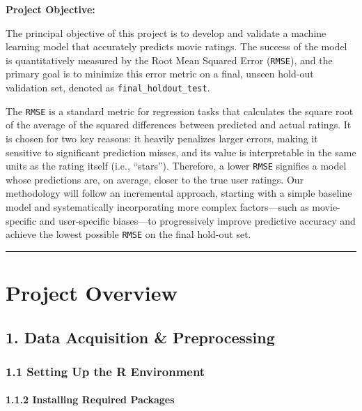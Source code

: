 \documentclass[
]{article}
\begin{document}
\textbf{Project Objective:}

The principal objective of this project is to develop and validate a
machine learning model that accurately predicts movie ratings. The
success of the model is quantitatively measured by the Root Mean Squared
Error (\texttt{RMSE}), and the primary goal is to minimize this error
metric on a final, unseen hold-out validation set, denoted as
\texttt{final\_holdout\_test}.

The \texttt{RMSE} is a standard metric for regression tasks that
calculates the square root of the average of the squared differences
between predicted and actual ratings. It is chosen for two key reasons:
it heavily penalizes larger errors, making it sensitive to significant
prediction misses, and its value is interpretable in the same units as
the rating itself (i.e., ``stars''). Therefore, a lower \texttt{RMSE}
signifies a model whose predictions are, on average, closer to the true
user ratings. Our methodology will follow an incremental approach,
starting with a simple baseline model and systematically incorporating
more complex factors---such as movie-specific and user-specific
biases---to progressively improve predictive accuracy and achieve the
lowest possible \texttt{RMSE} on the final hold-out set.

\begin{center}\rule{0.5\linewidth}{0.5pt}\end{center}

\section{Project Overview}\label{project-overview}

\subsection{1. Data Acquisition \&
Preprocessing}\label{data-acquisition-preprocessing}

\subsubsection{1.1 Setting Up the R
Environment}\label{setting-up-the-r-environment}

\paragraph{1.1.2 Installing Required
Packages}\label{installing-required-packages}
\end{document}
